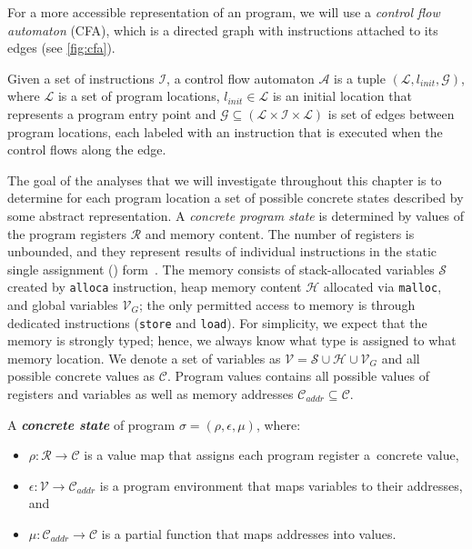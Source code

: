For a more accessible representation of an \llvm program, we will use a
\emph{control flow automaton} (CFA), which is a directed graph with \llvm
instructions attached to its edges (see \autoref{fig:cfa}).

\begin{definition}
    Given a set of instructions $\mathcal{I}$, a control flow automaton
    $\mathcal{A}$ is a tuple $(\mathcal{L}, l_{\textit{init}}, \mathcal{G})$,
    where $\mathcal{L}$ is a set of program locations, $l_{\textit{init}} \in
    \mathcal{L}$ is an initial location that represents a program entry point
    and $\mathcal{G} \subseteq (\mathcal{L} \times \mathcal{I} \times
    \mathcal{L})$ is set of edges between program locations, each labeled with
    an instruction that is executed when the control flows along the edge.
\end{definition}

The goal of the analyses that we will investigate throughout this chapter is to
determine for each program location a set of possible concrete states described
by some abstract representation. A \emph{concrete program state} is determined
by values of the program registers $\mathcal{R}$ and memory content. The number of \llvm
registers is unbounded, and they represent results of individual instructions
in the static single assignment (\ssa) form~\cite{Cytron1991}. The memory
consists of stack-allocated variables $\mathcal{S}$ created by \texttt{alloca}
instruction, heap memory content $\mathcal{H}$ allocated via \texttt{malloc}, and
global variables $\mathcal{V}_{\textit{G}}$; the only permitted access to memory is
through dedicated instructions (\texttt{store} and \texttt{load}).  For
simplicity, we expect that the memory is strongly typed; hence, we always know
what type is assigned to what memory location.
We denote a set of variables as $\mathcal{V} = \mathcal{S} \cup \mathcal{H}
\cup \mathcal{V}_{\textit{G}}$ and all possible concrete values as
$\mathcal{C}$.  Program values contains all possible values of registers and
variables as well as memory addresses $\mathcal{C}_{\textit{addr}} \subseteq
\mathcal{C}$.

\begin{definition}
    A \textbf{\emph{concrete state}} of \llvm program $\sigma = (\rho, \epsilon, \mu)$, where:
\begin{itemize}
    \item $\rho: \mathcal{R} \rightarrow \mathcal{C}$ is a value map that assigns each program
        register a~concrete value,
    \item $\epsilon : \mathcal{V} \rightarrow \mathcal{C}_{\textit{addr}}$ is a
        program environment that maps variables to their addresses, and
    \item $\mu: \mathcal{C}_{\textit{addr}} \rightarrow \mathcal{C}$ is a
        partial function that maps addresses into values.
\end{itemize}
\end{definition}


